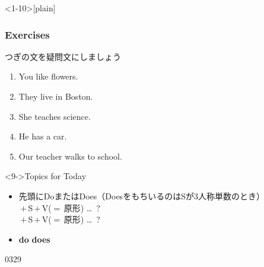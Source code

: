 \documentclass[aspectratio=169,dvipsnames]{beamer}
\newcommand{\myaudio}[1]{\href{#1}{\faVolumeUp}}
\begin{document}
\begin{frame}<1-10>[plain]\frametitle{Exercises}

つぎの文を疑問文にしましょう

 \begin{enumerate}
  \item<1-> You like flowers.\hspace{59.7pt}
  \item<1-> They live in Boston.\hspace{47.5pt}%
        \hfill{}
  \item<1-> She teaches science.\hspace{42pt}%
  \item<5-> He has  a car.\hspace{80.5pt}%
  \item<7-> Our teacher walks to school.
 \end{enumerate}

\begin{block}<9->{Topics for Today}\small
\begin{itemize}[square]
 \item   先頭にDoまたはDoes（DoesをもちいるのはSが3人称単数のとき）\\
	 \,$+$\,S\,$+$\,V{\scriptsize ($=$\,原形)} \ldots\,\,\,?\\
	 \,$+$\,S\,$+$\,V{\scriptsize ($=$\,原形)} \ldots\,\,\,?
 \item \textbf{do} \hspace{50pt}\textbf{does} 
\end{itemize}
     \end{block}

\vspace{-10pt}

\hfill{\tiny 0329}\,{\scriptsize \myaudio{./audio/010_question_do_06.mp3}}

\end{frame}
\end{document}
